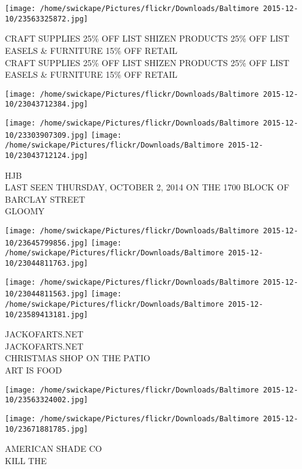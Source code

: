 \documentclass[10pt,letterpaper]{article}
\begin{document}
\vspace{0.25in}
\texttt{[image: /home/swickape/Pictures/flickr/Downloads/Baltimore 2015-12-10/23563325872.jpg]}

CRAFT SUPPLIES 25\% OFF LIST SHIZEN PRODUCTS 25\% OFF LIST EASELS \& FURNITURE 15\% OFF RETAIL\\
CRAFT SUPPLIES 25\% OFF LIST SHIZEN PRODUCTS 25\% OFF LIST EASELS \& FURNITURE 15\% OFF RETAIL\\
\pagebreak

\texttt{[image: /home/swickape/Pictures/flickr/Downloads/Baltimore 2015-12-10/23043712384.jpg]}

\vspace{0.25in}
\texttt{[image: /home/swickape/Pictures/flickr/Downloads/Baltimore 2015-12-10/23303907309.jpg]}
\texttt{[image: /home/swickape/Pictures/flickr/Downloads/Baltimore 2015-12-10/23043712124.jpg]}

HJB\\
LAST SEEN THURSDAY, OCTOBER 2, 2014 ON THE 1700 BLOCK OF BARCLAY STREET\\
GLOOMY\\
\pagebreak

\texttt{[image: /home/swickape/Pictures/flickr/Downloads/Baltimore 2015-12-10/23645799856.jpg]}
\texttt{[image: /home/swickape/Pictures/flickr/Downloads/Baltimore 2015-12-10/23044811763.jpg]}

\texttt{[image: /home/swickape/Pictures/flickr/Downloads/Baltimore 2015-12-10/23044811563.jpg]}
\texttt{[image: /home/swickape/Pictures/flickr/Downloads/Baltimore 2015-12-10/23589413181.jpg]}

JACKOFARTS.NET\\
JACKOFARTS.NET\\
CHRISTMAS SHOP ON THE PATIO\\
ART IS FOOD\\
\pagebreak

\texttt{[image: /home/swickape/Pictures/flickr/Downloads/Baltimore 2015-12-10/23563324002.jpg]}

\vspace{0.25in}
\texttt{[image: /home/swickape/Pictures/flickr/Downloads/Baltimore 2015-12-10/23671881785.jpg]}

AMERICAN SHADE CO\\
KILL THE\\
\pagebreak
\end{document}
